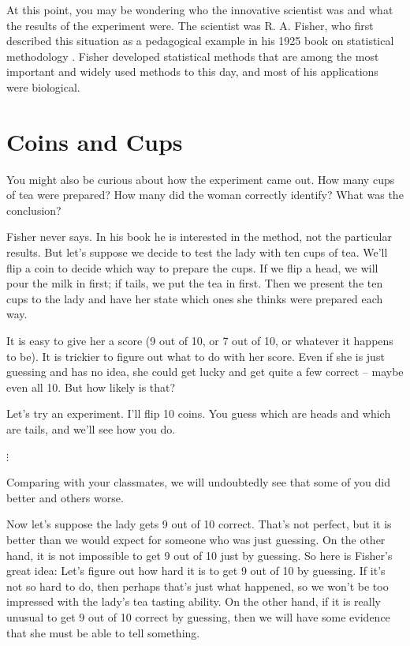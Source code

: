 \documentclass[twoside]{book}\usepackage[]{graphicx}\usepackage[]{xcolor}
\def\myindex#1{\index{#1}}
\newcounter{example}[section]
\begin{document}
At this point, you may be wondering who the innovative scientist was and 
what the results of the experiment were.
\myindex{Fisher, R. A.}%
The scientist was R. A. Fisher, who first described this situation
as a pedagogical example in his 1925 book on 
statistical methodology \cite{Fisher:1925:Methods}.
Fisher developed statistical methods that are among the most
important and widely used methods to this day, and most of his 
applications were biological.
\nocite{Fisher:1970:Methods}%


\section{Coins and Cups}
You might also be curious about how the experiment came out.
How many cups of tea were prepared?  How many did the woman 
correctly identify?  What was the conclusion?

Fisher never says.  In his book he is interested in the method, not the 
particular results.  But let's suppose we decide to test the lady with
ten cups of tea.  
We'll flip a coin to decide which way to prepare the cups.  
If we flip a head, we will pour the milk in first; if tails, we 
put the tea in first.
Then we present the ten cups to the lady and have her state which ones she
thinks were prepared each way.  

It is easy to give her a score (9 out of 10, or 7 out of 10, or whatever
it happens to be).  It is trickier to figure out what to do with her score.
Even if she is just guessing and has no idea, she could get lucky and 
get quite a few correct -- maybe even all 10.  But how likely is that?

Let's try an experiment.  I'll flip 10 coins.  You guess which are heads and
which are tails, and we'll see how you do.  

$\vdots$

Comparing with your classmates, we will undoubtedly see that some 
of you did better and others worse.

Now let's suppose the lady gets 9 out of 10 correct.  That's not perfect,
but it is better than we would expect for someone who was just guessing.
On the other hand, it is not impossible to get 9 out of 10 just by guessing.
So here is Fisher's great idea:  Let's figure out how hard it is to get
9 out of 10 by guessing.  If it's not so hard to do, then perhaps that's 
just what happened, so we won't be too impressed with the lady's tea tasting
ability.  On the other hand, if it is really unusual to get 9 out of 10 
correct by guessing, then we will have some evidence that she must 
be able to tell something.
\end{document}
